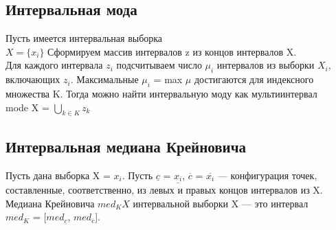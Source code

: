\documentclass[a4paper, 12pt]{article}
\begin{document}
\subsection{Интервальная мода}
Пусть имеется интервальная выборка\\
$X = \lbrace x_i \rbrace$
Сформируем массив интервалов z из концов интервалов X.
\\Для каждого интервала $z_i$ подсчитываем число $\mu _i$ интервалов из выборки $X_i$, включающих $z_i$. Максимальные $\mu _i$ = max $\mu$ достигаются для индексного множества K. Тогда можно найти
интервальную моду как мультиинтервал\\
mode X = $\bigcup_{k \in K}{z_k}$

\subsection{Интервальная медиана Крейновича}
Пусть дана выборка X = {$x_i$}. Пусть $\underline{c}$ = {$\underline{x_i}$}, $\overline{c}$ = {$\overline{x_i}$} — конфигурация точек, составленные, соответственно, из левых и правых концов интервалов из X. Медиана Крейновича $med_{K}X$ интервальной выборки X — это интервал\\ $med_K$ = [$med_{\underline{c}}$, $med_{\overline{c}}$].
\end{document}

